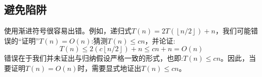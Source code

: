 \documentclass[a4paper,11pt]{article}
\newcommand{\floor}[1]{\left\lfloor #1 \right\rfloor}
\begin{document}
\subsection*{避免陷阱}
使用渐进符号很容易出错。例如，递归式$T(n)=2T(\floor{n/2})+n$，我们可能错误的“证明”$T(n)=O(n)$:猜测$T(n)\leq cn$，并论证:
\[
	T(n)\leq 2(c\floor{n/2})+n\leq cn+n=O(n)
\]
错误在于我们并未证出与归纳假设严格一致的形式，也即:$T(n)\leq cn$。因此，当要证明$T(n)=O(n)$时，需要显式地证出$T(n)\leq cn$。
\end{document}
